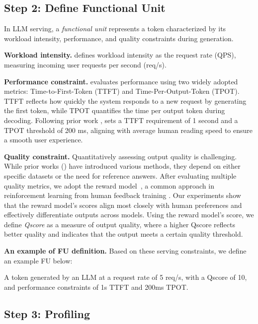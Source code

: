 \subsection{Step 2: Define Functional Unit}

In LLM serving, a \emph{functional unit} represents a token characterized by its workload intensity, performance, and quality constraints during generation. 

\noindent \textbf{Workload intensity.} \SYSTEM{} defines workload intensity as the request rate (QPS), measuring incoming user requests per second (req/s).

\noindent \textbf{Performance constraint.} \SYSTEM{} evaluates performance using two widely adopted metrics: Time-to-First-Token (TTFT) and Time-Per-Output-Token (TPOT). TTFT reflects how quickly the system responds to a new request by generating the first token, while TPOT quantifies the time per output token during decoding. Following prior work \citet{liu2024andes}, \SYSTEM{} sets a TTFT requirement of 1 second and a TPOT threshold of 200 ms, aligning with average human reading speed to ensure a smooth user experience.

\noindent \textbf{Quality constraint.} Quantitatively assessing output quality is challenging. While prior works (\citet{zhong2022unieval, yuan2021bartscore, jiang2023tigerscore}) have introduced various methods, they depend on either specific datasets or the need for reference answers. After evaluating multiple quality metrics, we adopt the reward model~\cite{liu2024skywork}, a common approach in reinforcement learning from human feedback training \cite{ouyang2022training}. Our experiments show that the reward model's scores align most closely with human preferences and effectively differentiate outputs across models. Using the reward model's score, we define \emph{Qscore} as a measure of output quality, where a higher Qscore reflects better quality and indicates that the output meets a certain quality threshold.

\noindent \textbf{An example of FU definition.} Based on these serving constraints, we define an example FU below:

\begin{tcolorbox}[def]
A token generated by an LLM at a request rate of 5 req/s, with a Qscore of 10, and performance constraints of 1s TTFT and 200ms TPOT.
\end{tcolorbox}

\subsection{Step 3: Profiling}


